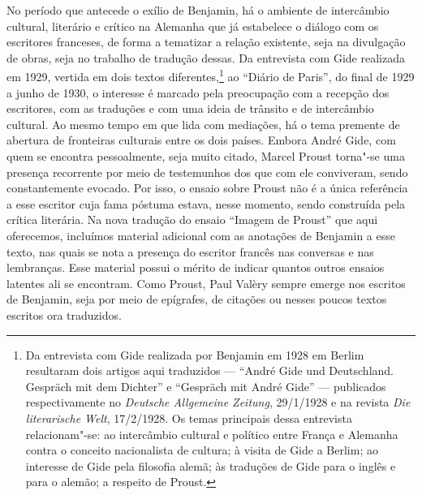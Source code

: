 No período que antecede o exílio de Benjamin, há o ambiente de
intercâmbio cultural, literário e crítico na Alemanha que já estabelece
o diálogo com os escritores franceses, de forma a tematizar a relação
existente, seja na divulgação de obras, seja no trabalho de tradução
dessas. Da entrevista com Gide realizada em 1929, vertida em dois textos
diferentes,\footnote{Da entrevista com Gide realizada por Benjamin em
  1928 em Berlim resultaram dois artigos aqui traduzidos --- ``André Gide
  und Deutschland. Gespräch mit dem Dichter'' e ``Gespräch mit André
  Gide'' --- publicados respectivamente no \emph{Deutsche Allgemeine
  Zeitung}, 29/1/1928 e na revista \emph{Die literarische Welt},
  17/2/1928. Os temas principais dessa entrevista relacionam"-se: ao
  intercâmbio cultural e político entre França e Alemanha contra o
  conceito nacionalista de cultura; à visita de Gide a Berlim; ao
  interesse de Gide pela filosofia alemã; às traduções de Gide para o
  inglês e para o alemão; a respeito de Proust.} ao ``Diário de
Paris'', do final de 1929 a junho de 1930, o interesse é marcado pela
preocupação com a recepção dos escritores, com as traduções e com uma
ideia de trânsito e de intercâmbio cultural. Ao mesmo tempo em que lida
com mediações, há o tema premente de abertura de fronteiras culturais
entre os dois países. Embora André Gide, com quem se encontra
pessoalmente, seja muito citado, Marcel Proust torna"-se uma presença
recorrente por meio de testemunhos dos que com ele conviveram, sendo
constantemente evocado. Por isso, o ensaio sobre Proust não é a única
referência a esse escritor cuja fama póstuma estava, nesse momento,
sendo construída pela crítica literária. Na nova tradução do ensaio
``Imagem de Proust'' que aqui oferecemos, incluímos material adicional
com as anotações de Benjamin a esse texto, nas quais se nota a presença
do escritor francês nas conversas e nas lembranças. Esse material possui
o mérito de indicar quantos outros ensaios latentes ali se encontram.
Como Proust, Paul Valèry sempre emerge nos escritos de Benjamin, seja
por meio de epígrafes, de citações ou nesses poucos textos escritos ora
traduzidos.

